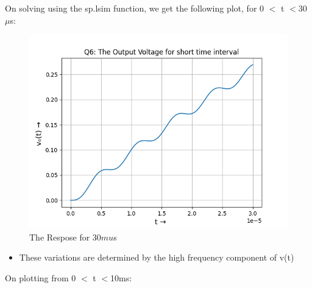 \documentclass[11pt, a4paper]{article}
\begin{document}
On solving using the sp.lsim function, we get the following plot,
for 0 $<$ t $ <$30$\mu$s:

\begin{figure}[!tbh]
 \centering
 \includegraphics[scale=0.6]{Ass6_Figure_6.png} 
 \caption{The Respose for 30$mu$s}
\end{figure}
\begin{itemize}
    \item These variations are determined by the high frequency component of v(t)
\end{itemize}
\cleardoublepage
On plotting from 0 $<$ t $ <$10ms:
\end{document}
